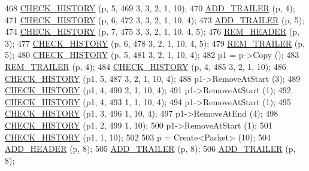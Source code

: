 \begin{DoxyCode}
468   \hyperlink{packet-metadata-test_8cc_a15a730e778d9d498a39e778bcd39684c}{CHECK\_HISTORY} (p, 5, 
469                  3, 3, 2, 1, 10);
470   \hyperlink{packet-metadata-test_8cc_ab10bc130bb7184d47509ea44f4fb24df}{ADD\_TRAILER} (p, 4);
471   \hyperlink{packet-metadata-test_8cc_a15a730e778d9d498a39e778bcd39684c}{CHECK\_HISTORY} (p, 6, 
472                  3, 3, 2, 1, 10, 4);
473   \hyperlink{packet-metadata-test_8cc_ab10bc130bb7184d47509ea44f4fb24df}{ADD\_TRAILER} (p, 5);
474   \hyperlink{packet-metadata-test_8cc_a15a730e778d9d498a39e778bcd39684c}{CHECK\_HISTORY} (p, 7, 
475                  3, 3, 2, 1, 10, 4, 5);
476   \hyperlink{packet-metadata-test_8cc_a8694c61c9ba33c72896dde3628538a84}{REM\_HEADER} (p, 3);
477   \hyperlink{packet-metadata-test_8cc_a15a730e778d9d498a39e778bcd39684c}{CHECK\_HISTORY} (p, 6, 
478                  3, 2, 1, 10, 4, 5);
479   \hyperlink{packet-metadata-test_8cc_a1e12d07d4d7c9ab1695230cdf925b4d6}{REM\_TRAILER} (p, 5);
480   \hyperlink{packet-metadata-test_8cc_a15a730e778d9d498a39e778bcd39684c}{CHECK\_HISTORY} (p, 5, 
481                  3, 2, 1, 10, 4);
482   p1 = p->Copy ();
483   \hyperlink{packet-metadata-test_8cc_a1e12d07d4d7c9ab1695230cdf925b4d6}{REM\_TRAILER} (p, 4);
484   \hyperlink{packet-metadata-test_8cc_a15a730e778d9d498a39e778bcd39684c}{CHECK\_HISTORY} (p, 4, 
485                  3, 2, 1, 10);
486   \hyperlink{packet-metadata-test_8cc_a15a730e778d9d498a39e778bcd39684c}{CHECK\_HISTORY} (p1, 5, 
487                  3, 2, 1, 10, 4);
488   p1->RemoveAtStart (3);
489   \hyperlink{packet-metadata-test_8cc_a15a730e778d9d498a39e778bcd39684c}{CHECK\_HISTORY} (p1, 4, 
490                  2, 1, 10, 4);
491   p1->RemoveAtStart (1);
492   \hyperlink{packet-metadata-test_8cc_a15a730e778d9d498a39e778bcd39684c}{CHECK\_HISTORY} (p1, 4, 
493                  1, 1, 10, 4);
494   p1->RemoveAtStart (1);
495   \hyperlink{packet-metadata-test_8cc_a15a730e778d9d498a39e778bcd39684c}{CHECK\_HISTORY} (p1, 3, 
496                  1, 10, 4);
497   p1->RemoveAtEnd (4);
498   \hyperlink{packet-metadata-test_8cc_a15a730e778d9d498a39e778bcd39684c}{CHECK\_HISTORY} (p1, 2, 
499                  1, 10);
500   p1->RemoveAtStart (1);
501   \hyperlink{packet-metadata-test_8cc_a15a730e778d9d498a39e778bcd39684c}{CHECK\_HISTORY} (p1, 1, 10);
502 
503   p = Create<Packet> (10);
504   \hyperlink{packet-metadata-test_8cc_a120012d48d29d678b3138d5c7b9bf714}{ADD\_HEADER} (p, 8);
505   \hyperlink{packet-metadata-test_8cc_ab10bc130bb7184d47509ea44f4fb24df}{ADD\_TRAILER} (p, 8);
506   \hyperlink{packet-metadata-test_8cc_ab10bc130bb7184d47509ea44f4fb24df}{ADD\_TRAILER} (p, 8);

\end{DoxyCode}
